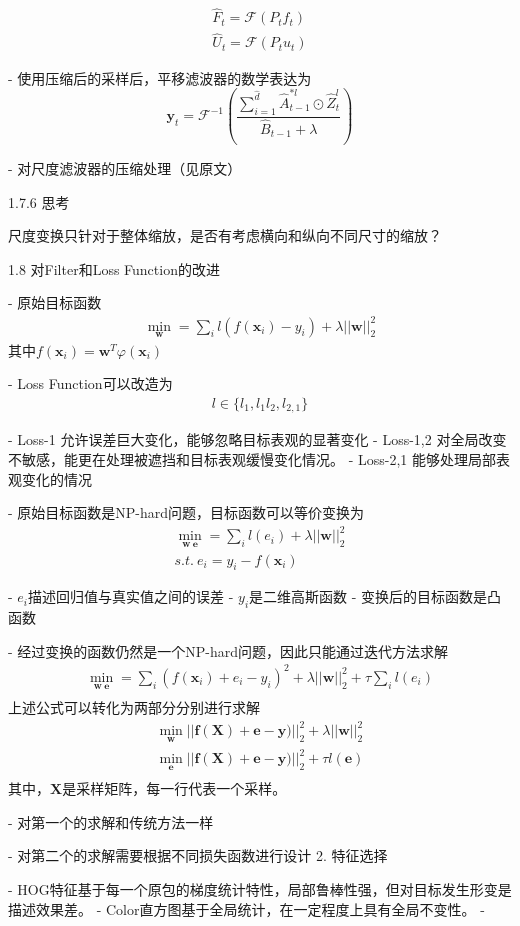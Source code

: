 \begin{align}
\hat{F}_t=\mathcal{F}(P_tf_t)\\
\hat{U}_t=\mathcal{F}(P_tu_t)
\end{align}

- 使用压缩后的采样后，平移滤波器的数学表达为
\begin{equation}
\mathbf{y}_t={\mathcal{F}^{-1}}(\frac{\sum_{i=1}^{\hat{d}}{\hat{A}^{*l}_{t-1}} \odot \hat{Z}^{l}_{t}}{\hat{B}_{t-1}+\lambda})
\end{equation}


- 对尺度滤波器的压缩处理（见原文）

 1.7.6 思考

尺度变换只针对于整体缩放，是否有考虑横向和纵向不同尺寸的缩放？

1.8 对Filter和Loss Function的改进

- 原始目标函数
\begin{align}
\min_\mathbf{w}=\sum_{i}l(f(\mathbf{x}_i)-y_i)+\lambda||\mathbf{w}||^2_2
\end{align}
其中$f(\mathbf{x}_i)=\mathbf{w}^T\varphi(\mathbf{x}_i)$

- Loss Function可以改造为
\begin{align}
l \in \{l_1, l_1l_2, l_{2,1}\}
\end{align}

- Loss-1 允许误差巨大变化，能够忽略目标表观的显著变化
- Loss-1,2 对全局改变不敏感，能更在处理被遮挡和目标表观缓慢变化情况。
- Loss-2,1 能够处理局部表观变化的情况

- 原始目标函数是NP-hard问题，目标函数可以等价变换为
\begin{align}
\min_{\mathbf{w}\ \mathbf{e}}=\sum_{i}l(e_i)+\lambda||\mathbf{w}||^2_2\\
s.t.\ e_i=y_i - f(\mathbf{x}_i)
\end{align}

- $e_i$描述回归值与真实值之间的误差
- $y_i$是二维高斯函数
- 变换后的目标函数是凸函数

- 经过变换的函数仍然是一个NP-hard问题，因此只能通过迭代方法求解
\begin{align}
\min_{\mathbf{w}\ \mathbf{e}}=\sum_{i}(f(\mathbf{x}_i) + e_i - y_i)^2+\lambda||\mathbf{w}||^2_2 + \tau \sum_i l(e_i)\\
\end{align}
上述公式可以转化为两部分分别进行求解
\begin{align}
\min_{\mathbf{w}}||\mathbf{f}(\mathbf{X})+\mathbf{e}-\mathbf{y})||^2_2+\lambda||\mathbf{w}||^2_2\\
\min_{\mathbf{e}}||\mathbf{f}(\mathbf{X})+\mathbf{e}-\mathbf{y})||^2_2+\tau l(\mathbf{e})\\
\end{align}
其中，$\mathbf{X}$是采样矩阵，每一行代表一个采样。

- 对第一个的求解和传统方法一样

- 对第二个的求解需要根据不同损失函数进行设计
 2. 特征选择

- HOG特征基于每一个原包的梯度统计特性，局部鲁棒性强，但对目标发生形变是描述效果差。
- Color直方图基于全局统计，在一定程度上具有全局不变性。
- ​

 
